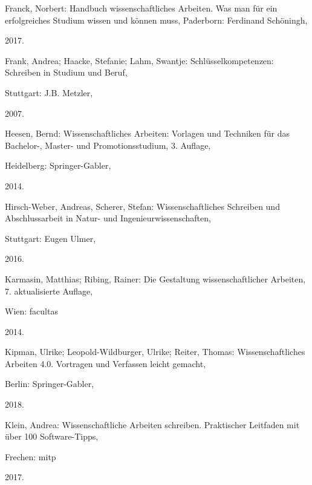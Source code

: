 \documentclass[a4paper,11pt]{article}%
\renewcommand{\\}{\vspace*{0.5\baselineskip} \newline}
\begin{document}
\begin{thebibliography}{1}

	Franck, Norbert: Handbuch wissenschaftliches Arbeiten. Was man für ein erfolgreiches Studium wissen und können muss, Paderborn: Ferdinand Schöningh,

	2017.

	


	Frank, Andrea; Haacke, Stefanie; Lahm, Swantje: Schlüsselkompetenzen: Schreiben in Studium und Beruf,

	Stuttgart: J.B. Metzler,

	2007.

	


	Heesen, Bernd: Wissenschaftliches Arbeiten: Vorlagen und Techniken für das Bachelor-, Master- und Promotionsstudium, 3. Auflage, 

	Heidelberg: Springer-Gabler,

	2014.

	


	Hirsch-Weber, Andreas, Scherer, Stefan: Wissenschaftliches Schreiben und Abschlussarbeit in Natur- und Ingenieurwissenschaften,

	Stuttgart: Eugen Ulmer,

	2016.

	


	Karmasin, Matthias; Ribing, Rainer: Die Gestaltung wissenschaftlicher Arbeiten, 7. aktualisierte Auflage,

	Wien: facultas

	2014.

	


	Kipman, Ulrike; Leopold-Wildburger, Ulrike; Reiter, Thomas: Wissenschaftliches Arbeiten 4.0. Vortragen und Verfassen leicht gemacht,

	Berlin: Springer-Gabler,

	2018.

	


	Klein, Andrea: Wissenschaftliche Arbeiten schreiben. Praktischer Leitfaden mit über 100 Software-Tipps,

	Frechen: mitp

	2017.

	



\end{thebibliography}
\end{document}
